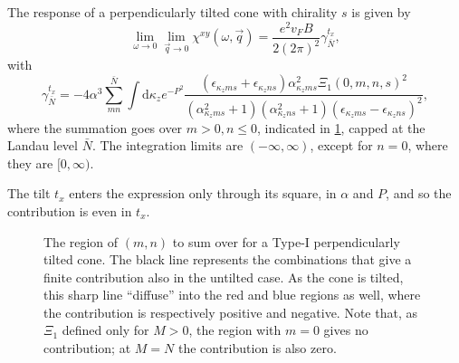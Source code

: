 \begin{summary}
  The response of a perpendicularly tilted cone with chirality \( s \) is given by
  \begin{equation}
    \label{eq:118}
    \lim_{\omega \to 0} \lim_{\vec{q} \to 0} \chi^{xy}(\omega, \vec{q}) =
    \frac{e^2v_F B }{2 (2 \pi)^2 }
    \gamma^{t_x}_{\bar{N}},
  \end{equation}
  with
  \begin{equation}
    \label{eq:119}
    \gamma^{t_x}_{\bar{N}} =
    -4 \alpha^3
    \sum\limits_{mn}^{{\bar{N}}}
    \int \mathrm{d}\kappa_z
    e^{-P^2}
    \frac{
      (\epsilon_{\kappa_z m s} + \epsilon_{\kappa_z n s})
      \alpha_{\kappa_z m s}^2 \Xi_1(0, m,n, s)^2
    }{
      (\alpha_{\kappa_z m s}^2 + 1)(\alpha_{\kappa_z n s}^2 + 1)
      (\epsilon_{\kappa_z m s} - \epsilon_{\kappa_z ns})^2
    },
  \end{equation}
  where the summation goes over \( m > 0, n \leq 0 \), indicated in \cref{fig:nmregion}, capped at the Landau level \( \bar{N} \).
  The integration limits are \( (-\infty, \infty) \), except for \( n = 0 \), where they are \( [0, \infty) \).

  The tilt \( t_x \) enters the expression only through its square, in \( \alpha \) and \( P \), and so the contribution is even in \( t_x \).
\end{summary}


\begin{figure}[ht]
  \centering
  \caption{The region of \( (m,n) \) to sum over for a Type-I perpendicularly tilted cone.
    The black line represents the combinations that give a finite contribution also in the untilted case.
    As the cone is tilted, this sharp line ``diffuse'' into the red and blue regions as well, where the contribution is respectively positive and negative.
    Note that, as \( \Xi_1 \) defined only for \( M>0\), the region with \( m=0 \) gives no contribution;
    at \( M=N \) the contribution is also zero.%
  }
  \label{fig:nmregion}
\end{figure}

